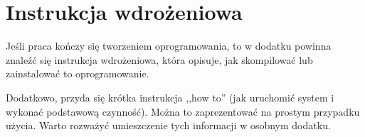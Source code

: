 \chapter{Instrukcja wdrożeniowa}
Jeśli praca kończy się tworzeniem oprogramowania, to w dodatku powinna znaleźć się instrukcja wdrożeniowa, która opisuje, jak skompilować lub zainstalować to oprogramowanie.

Dodatkowo, przyda się krótka instrukcja ,,how to'' (jak uruchomić system i wykonać podstawową czynność). Można to zaprezentować na prostym przypadku użycia. Warto rozważyć umieszczenie tych informacji w osobnym dodatku.
